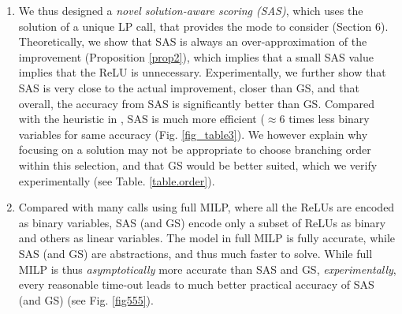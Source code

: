 \begin{enumerate}
	\item We thus designed a {\em novel solution-aware scoring ({\sf SAS})}, which uses the solution of a unique LP call, that provides the mode to consider (Section 6). Theoretically, we show that {\sf SAS} is always an over-approximation of the improvement (Proposition \ref{prop2}), which implies that a small {\sf SAS} value implies that the ReLU is unnecessary. Experimentally, we further show that {\sf SAS} is very close to the actual improvement, closer than {\sf GS}, and that overall, the accuracy from SAS is significantly better than {\sf GS}.  Compared with the heuristic in \cite{DivideAndSlide},  {\sf SAS} is much more efficient ($\approx 6$ times less binary variables for same accuracy (Fig. \ref{fig_table3}). We however explain why focusing on a solution may not be appropriate to choose branching order within this selection, and that GS would be better suited, which we verify experimentally ({\color{red}see Table. \ref{table.order}}).
	
	\item Compared with many calls using full MILP, where all the ReLUs are encoded as binary variables, {\sf SAS} (and {\sf GS}) encode only a subset of ReLUs as binary and others as linear variables. The model in full MILP is fully accurate, while {\sf SAS} (and {\sf GS})
	are abstractions, and thus much faster to solve. 
	While full MILP is thus {\em asymptotically} more accurate than {\sf SAS} and {\sf GS}, {\em experimentally}, every reasonable time-out leads to much better practical accuracy of {\sf SAS} (and {\sf GS}) ({\color{red}see Fig. \ref{fig555}}).

	

\end{enumerate}
